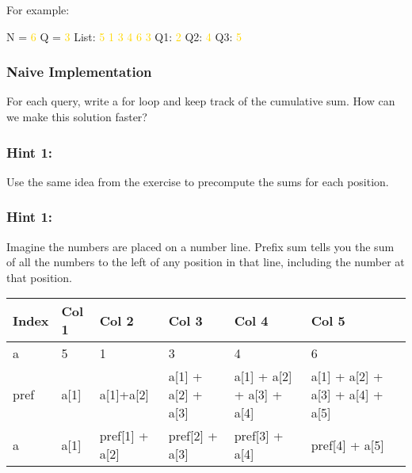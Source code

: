 \documentclass{report}
\begin{document}
For example:
\begin{tcolorbox}[mybox]
    N = \textcolor{gold}{6} Q = \textcolor{gold}{3} \newline
    List: \textcolor{gold}{5 1 3 4 6 3} \newline
    Q1: \textcolor{gold}{2} \newline
    Q2: \textcolor{gold}{4} \newline
    Q3: \textcolor{gold}{5} 
\end{tcolorbox}

\subsubsection*{Naive Implementation}
For each query, write a for loop and keep track of the cumulative sum. How can we make this solution faster?

\subsubsection*{Hint 1:}
Use the same idea from the exercise to precompute the sums for each position.

\subsubsection*{Hint 1:}
Imagine the numbers are placed on a number line. Prefix sum tells you the sum of all the numbers to the left of any position in that line, including the number at that position. 

\begin{table}[ht]
    \centering
    \begin{tabularx}{\linewidth}{|X|X|X|X|X|X|X|}
        \hline
        \cellcolor{gray!25} \textbf{Index} & \cellcolor{gray!25} \textbf{Col 1} & \cellcolor{gray!25} \textbf{Col 2} & \cellcolor{gray!25} \textbf{Col 3} & \cellcolor{gray!25} \textbf{Col 4} & \cellcolor{gray!25} \textbf{Col 5} \\
        \hline
        \cellcolor{gray!25}a & 5 & 1 & 3 & 4 & 6 \\
        \hline
        \cellcolor{gray!25}pref & a[1] & a[1]+a[2] & a[1] + a[2] + a[3] & a[1] + a[2] + a[3] + a[4] & a[1] + a[2] + a[3] + a[4] + a[5] \\
        \hline
        \cellcolor{gray!25}a & a[1] & pref[1] + a[2] & pref[2] + a[3] & pref[3] + a[4] & pref[4] + a[5] \\
        \hline
    \end{tabularx}
\end{table}
\end{document}
